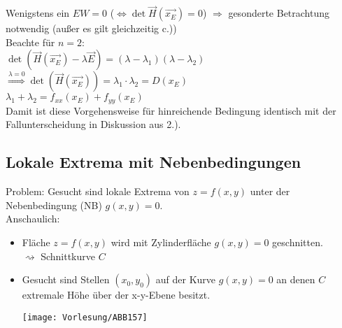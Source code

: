 \begin{enumerate}
\begin{itemize}
\begin{anumerate}
\item Wenigstens ein $EW = 0$ ($\Leftrightarrow \det \vec{H}(\vec{x_E})=0$) $\Rightarrow$ gesonderte Betrachtung notwendig (außer es gilt gleichzeitig c.))\\
Beachte für $n=2$:\\
$\det (\vec{H}(\vec{x_E})-\lambda \vec{E})=(\lambda - \lambda_1)(\lambda-\lambda_2)$\\
$\overset{\lambda = 0}{\Rightarrow} \det (\vec{H}(\vec{x_E}))=\lambda_1 \cdot \lambda_2 = D(x_E)$\\
$\lambda_1 + \lambda_2=f_{xx}(x_E)+f_{yy}(x_E)$\\
Damit ist diese Vorgehensweise für hinreichende Bedingung identisch mit der Fallunterscheidung in Diskussion aus 2.).
\end{anumerate}
\end{itemize}
\end{enumerate}

\subsection{Lokale Extrema mit Nebenbedingungen}
Problem: Gesucht sind lokale Extrema von $z=f(x,y)$ unter der Nebenbedingung (NB) $g(x,y)=0$.\\
Anschaulich:
\begin{itemize}
\item Fläche $z=f(x,y)$ wird mit Zylinderfläche $g(x,y)=0$ geschnitten.\\
$\rightsquigarrow$ Schnittkurve $C$
\item Gesucht sind Stellen $(x_0,y_0)$ auf der Kurve $g(x,y)=0$ an denen $C$ extremale Höhe über der x-y-Ebene besitzt.
\begin{center}
\texttt{[image: Vorlesung/ABB157]}
\end{center}
\end{itemize}

